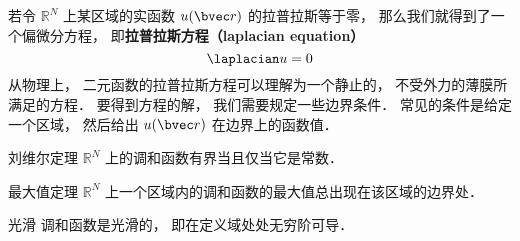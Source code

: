 
\begin{issues}
\issueDraft
\end{issues}


若令 $\mathbb R^N$ 上某区域的实函数 $u(\bvec r)$ 的拉普拉斯等于零， 那么我们就得到了一个偏微分方程， 即\textbf{拉普拉斯方程（laplacian equation）}
\begin{equation}
\laplacian u = 0
\end{equation}
从物理上， 二元函数的拉普拉斯方程可以理解为一个静止的， 不受外力的薄膜所满足的方程． 要得到方程的解， 我们需要规定一些边界条件． 常见的条件是给定一个区域， 然后给出 $u(\bvec r)$ 在边界上的函数值．

\begin{theorem}{刘维尔定理}\label{LapEq_the1}
$\mathbb R^N$ 上的调和函数有界当且仅当它是常数．
\end{theorem}

\begin{theorem}{最大值定理}
$\mathbb R^N$ 上一个区域内的调和函数的最大值总出现在该区域的边界处．
\end{theorem}

\begin{theorem}{光滑}
调和函数是光滑的， 即在定义域处处无穷阶可导．
\end{theorem}
